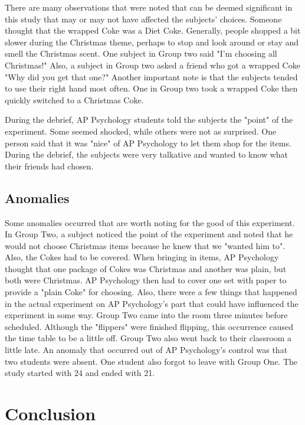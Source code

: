 \documentclass[twoside]{article}
\begin{document}
\begin{multicols}{2}
There are many observations that were noted that can be deemed significant in this study that may or may not have affected the subjects' choices. Someone thought that the wrapped Coke was a Diet Coke. Generally, people shopped a bit slower during the Christmas theme, perhaps to stop and look around or stay and smell the Christmas scent. One subject in Group two said "I'm choosing all Christmas!" Also, a subject in Group two asked a friend who got a wrapped Coke "Why did you get that one?" Another important note is that the subjects tended to use their right hand most often. One in Group two took a wrapped Coke then quickly switched to a Christmas Coke. 

During the debrief, AP Psychology students told the subjects the "point" of the experiment. Some seemed shocked, while others were not as surprised. One person said that it was "nice" of AP Psychology to let them shop for the items. During the debrief, the subjects were very talkative and wanted to know what their friends had chosen. 



\subsection{Anomalies}
Some anomalies occurred that are worth noting for the good of this experiment. In Group Two, a subject noticed the point of the experiment and noted that he would not choose Christmas items because he knew that we "wanted him to". Also, the Cokes had to be covered. When bringing in items, AP Psychology thought that one package of Cokes was Christmas and another was plain, but both were Christmas. AP Psychology then had to cover one set with paper to provide a "plain Coke" for choosing. Also, there were a few things that happened in the actual experiment on AP Psychology's part that could have influenced the experiment in some way. Group Two came into the room three minutes before scheduled. Although the "flippers" were finished flipping, this occurrence caused the time table to be a little off. Group Two also went back to their classroom a little late. An anomaly that occurred out of AP Psychology's control was that two students were absent. One student also forgot to leave with Group One. The study started with 24 and ended with 21. 

\section{Conclusion}


\end{multicols}
\end{document}
